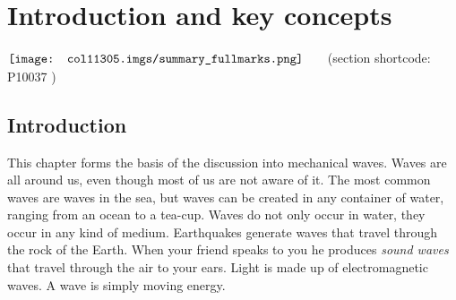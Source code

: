          \section{ Introduction and key concepts}
    \nopagebreak
            \label{m38801} $ \hspace{-5pt}\begin{array}{cccccccccccc}   \texttt{[image: col11305.imgs/summary\_fullmarks.png]} &   \end{array} $ \hspace{2 pt}\raisebox{-5 pt}{} {(section shortcode: P10037 )} \par 
    \label{m38801*cid2}
            \subsection{ Introduction}
            \nopagebreak
      \label{m38801*id312450}This chapter forms the basis of the discussion into mechanical waves. Waves are all around us, even though most of us are not aware of it. The most common waves are waves in the sea, but waves can be created in any container of water, ranging from an ocean to a tea-cup. Waves do not only occur in water, they occur in any kind of medium. Earthquakes generate waves that travel through the rock of the Earth. When your friend speaks to you he produces \textsl{sound waves} that travel through the air to your ears. Light is made up of electromagnetic waves. A wave is simply moving energy.\par 
    \label{m38801*cid3}
